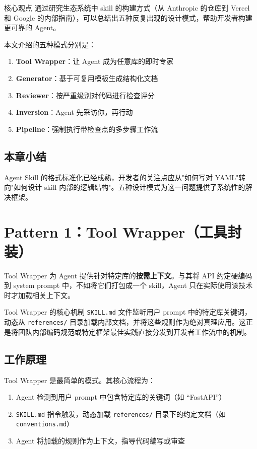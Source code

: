 \documentclass[a4paper]{article}
\begin{document}
\begin{importantbox}{核心观点}
通过研究生态系统中 skill 的构建方式（从 Anthropic 的仓库到 Vercel 和 Google 的内部指南），可以总结出五种反复出现的设计模式，帮助开发者构建更可靠的 Agent。
\end{importantbox}

本文介绍的五种模式分别是：
\begin{enumerate}
    \item \textbf{Tool Wrapper}：让 Agent 成为任意库的即时专家
    \item \textbf{Generator}：基于可复用模板生成结构化文档
    \item \textbf{Reviewer}：按严重级别对代码进行检查评分
    \item \textbf{Inversion}：Agent 先采访你，再行动
    \item \textbf{Pipeline}：强制执行带检查点的多步骤工作流
\end{enumerate}

\subsection{本章小结}

Agent Skill 的格式标准化已经成熟，开发者的关注点应从"如何写对 YAML"转向"如何设计 skill 内部的逻辑结构"。五种设计模式为这一问题提供了系统性的解决框架。

\section{Pattern 1：Tool Wrapper（工具封装）}

Tool Wrapper 为 Agent 提供针对特定库的\textbf{按需上下文}。与其将 API 约定硬编码到 system prompt 中，不如将它们打包成一个 skill，Agent 只在实际使用该技术时才加载相关上下文。

\begin{importantbox}{Tool Wrapper 的核心机制}
\texttt{SKILL.md} 文件监听用户 prompt 中的特定库关键词，动态从 \texttt{references/} 目录加载内部文档，并将这些规则作为绝对真理应用。这正是将团队内部编码规范或特定框架最佳实践直接分发到开发者工作流中的机制。
\end{importantbox}

\subsection{工作原理}

Tool Wrapper 是最简单的模式。其核心流程为：

\begin{enumerate}
    \item Agent 检测到用户 prompt 中包含特定库的关键词（如 ``FastAPI''）
    \item \texttt{SKILL.md} 指令触发，动态加载 \texttt{references/} 目录下的约定文档（如 \texttt{conventions.md}）
    \item Agent 将加载的规则作为上下文，指导代码编写或审查
\end{enumerate}
\end{document}
